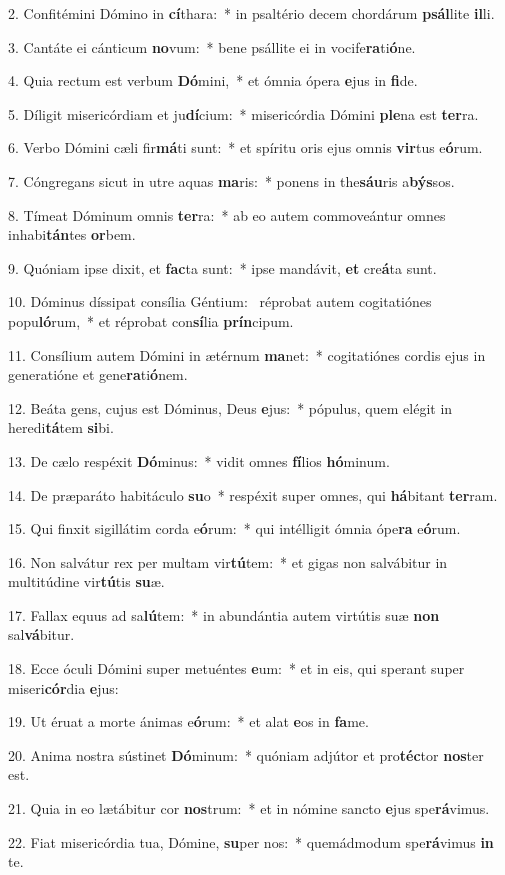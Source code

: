 2. Confitémini Dómino in \textbf{cí}thara:~*  in psaltério decem chordárum \textbf{psál}lite \textbf{il}li.\

3. Cantáte ei cánticum \textbf{no}vum:~*  bene psállite ei in vocife\textbf{ra}ti\textbf{ó}ne.\

4. Quia rectum est verbum \textbf{Dó}mini,~*  et ómnia ópera \textbf{e}jus in \textbf{fi}de.\

5. Díligit misericórdiam et ju\textbf{dí}cium:~*  misericórdia Dómini \textbf{ple}na est \textbf{ter}ra.\

6. Verbo Dómini cæli fir\textbf{má}ti sunt:~*  et spíritu oris ejus omnis \textbf{vir}tus e\textbf{ó}rum.\

7. Cóngregans sicut in utre aquas \textbf{ma}ris:~*  ponens in the\textbf{sáu}ris a\textbf{býs}sos.\

8. Tímeat Dóminum omnis \textbf{ter}ra:~*  ab eo autem commoveántur omnes inhabi\textbf{tán}tes \textbf{or}bem.\

9. Quóniam ipse dixit, et \textbf{fac}ta sunt:~*  ipse mandávit, \textbf{et} cre\textbf{á}ta sunt.\

10. Dóminus díssipat consília Géntium: \dag\  réprobat autem cogitatiónes popu\textbf{ló}rum,~*  et réprobat con\textbf{sí}lia \textbf{prín}cipum.\

11. Consílium autem Dómini in ætérnum \textbf{ma}net:~*  cogitatiónes cordis ejus in generatióne et gene\textbf{ra}ti\textbf{ó}nem.\

12. Beáta gens, cujus est Dóminus, Deus \textbf{e}jus:~*  pópulus, quem elégit in heredi\textbf{tá}tem \textbf{si}bi.\

13. De cælo respéxit \textbf{Dó}minus:~*  vidit omnes \textbf{fí}lios \textbf{hó}minum.\

14. De præparáto habitáculo \textbf{su}o~*  respéxit super omnes, qui \textbf{há}bitant \textbf{ter}ram.\

15. Qui finxit sigillátim corda e\textbf{ó}rum:~*  qui intélligit ómnia ópe\textbf{ra} e\textbf{ó}rum.\

16. Non salvátur rex per multam vir\textbf{tú}tem:~*  et gigas non salvábitur in multitúdine vir\textbf{tú}tis \textbf{su}æ.\

17. Fallax equus ad sa\textbf{lú}tem:~*  in abundántia autem virtútis suæ \textbf{non} sal\textbf{vá}bitur.\

18. Ecce óculi Dómini super metuéntes \textbf{e}um:~*  et in eis, qui sperant super miseri\textbf{cór}dia \textbf{e}jus:\

19. Ut éruat a morte ánimas e\textbf{ó}rum:~*  et alat \textbf{e}os in \textbf{fa}me.\

20. Anima nostra sústinet \textbf{Dó}minum:~*  quóniam adjútor et pro\textbf{téc}tor \textbf{nos}ter est.\

21. Quia in eo lætábitur cor \textbf{nos}trum:~*  et in nómine sancto \textbf{e}jus spe\textbf{rá}vimus.\

22. Fiat misericórdia tua, Dómine, \textbf{su}per nos:~*  quemádmodum spe\textbf{rá}vimus \textbf{in} te.\

